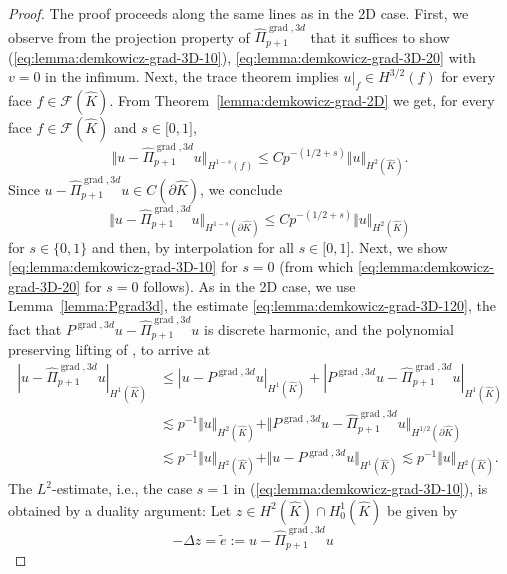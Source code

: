 \documentclass{article}
\newcommand{\hatPigradcom}{\widehat\Pi^{\operatorname*{grad},3d}_{p+1}}
\begin{document}
\begin{proof}
The proof proceeds along the same lines as in the 2D case. First, we observe from the 
projection property of $\hatPigradcom$ that it suffices to show 
(\ref{eq:lemma:demkowicz-grad-3D-10}), \eqref{eq:lemma:demkowicz-grad-3D-20} with $v = 0$ in the infimum. 
Next, the trace theorem implies $u|_{f} \in H^{3/2}(f)$ for every face $f \in {\mathcal F}(\widehat K)$. 
{}From Theorem~\ref{lemma:demkowicz-grad-2D} we get, for every face $f\in{\mathcal{F}%
}(\widehat{K})$ and $s\in\lbrack0,1]$,
\begin{equation}
\Vert u-\hatPigradcom u\Vert_{H^{1-s}(f)}\leq Cp^{-(1/2+s)}%
\Vert u\Vert_{H^{2}(\widehat{K})}.
\end{equation}
Since  $u-\hatPigradcom u\in
C(\partial\widehat{K})$, we conclude
\begin{equation}
\Vert u-\hatPigradcom u\Vert_{H^{1-s}(\partial \widehat{K})}\leq
Cp^{-(1/2+s)}\Vert u\Vert_{H^{2}(\widehat{K})}
\label{eq:lemma:demkowicz-grad-3D-120}%
\end{equation}
for $s\in\{0,1\}$ and then, by interpolation for all $s\in\lbrack0,1]$. 
Next, we show \eqref{eq:lemma:demkowicz-grad-3D-10} for $s=0$ (from which \eqref{eq:lemma:demkowicz-grad-3D-20} for $s=0$ follows). As in the 2D case, we use 
Lemma~\ref{lemma:Pgrad3d}, the estimate \eqref{eq:lemma:demkowicz-grad-3D-120}, 
the fact that $P^{\operatorname{grad},3d} u - \hatPigradcom u$ is discrete harmonic, and 
the polynomial preserving lifting of \cite{munoz-sola97}, to arrive at 
\begin{align}
\nonumber |u-\hatPigradcom u|_{H^{1}(\widehat{K})} &\leq |u-P^{\operatorname*{grad},3d}u|_{H^1(\widehat{K})} + |P^{\operatorname*{grad},3d}u-\hatPigradcom u|_{H^1(\widehat{K})} \\
\label{eq:lemma:demkowicz-grad-3D-145} &\lesssim p^{-1} \Vert u\Vert_{H^2(\widehat{K})} + \Vert P^{\operatorname*{grad},3d}u-\hatPigradcom u\Vert_{H^{1/2}(\partial\widehat{K})} \\
\nonumber &\lesssim p^{-1} \Vert u\Vert_{H^2(\widehat{K})} + \Vert u-P^{\operatorname*{grad},3d}u\Vert_{H^1(\widehat{K})} 
\lesssim p^{-1} \Vert u\Vert_{H^2(\widehat{K})}.
\end{align}
The $L^{2}$-estimate, i.e., the case $s = 1$ in (\ref{eq:lemma:demkowicz-grad-3D-10}), 
is obtained by a duality argument: Let $z\in
H^{2}(\widehat{K})\cap H_{0}^{1}(\widehat{K})$ be given by
\[
-\Delta z=\widetilde{e}:=u-\hatPigradcom u\quad
\]
\end{proof}
\end{document}
